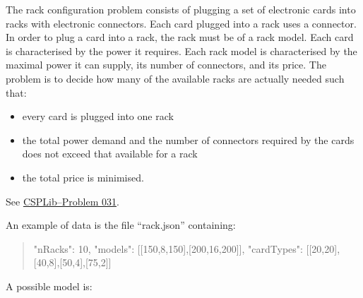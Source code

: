 \documentclass[10pt]{article}
\newenvironment{myvb}{\endgraf\small\verbatim}{\endverbatim}
\begin{document}
The rack configuration problem consists of plugging a set of electronic cards into racks with electronic connectors.
Each card plugged into a rack uses a connector.
In order to plug a card into a rack, the rack must be of a rack model.
Each card is characterised by the power it requires.
Each rack model is characterised by the maximal power it can supply, its number of connectors, and its price.
The problem is to decide how many of the available racks are actually needed such that: %
\begin{itemize}
\item every card is plugged into one rack
\item the total power demand and the number of connectors required by the cards does not exceed that available for a rack
\item the total price is minimised.
\end{itemize}
See \href{http://csplib.org/Problems/prob031/}{CSPLib--Problem 031}.


An example of data is the file ``rack.json'' containing:

{\small
\begin{quote}
\begin{myvb}
{
  "nRacks": 10,
  "models": [[150,8,150],[200,16,200]],
  "cardTypes": [[20,20],[40,8],[50,4],[75,2]]
}
\end{myvb}
\end{quote}
}

A possible model is:
\end{document}
